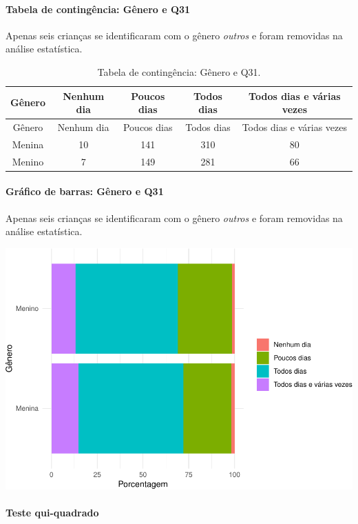 \documentclass[]{article}
\let\oldparagraph\paragraph
\renewcommand{\paragraph}[1]{\oldparagraph{#1}\mbox{}}
\begin{document}
\cleardoublepage

\hypertarget{tabela-de-continguxeancia-guxeanero-e-q31}{%
\paragraph{Tabela de contingência: Gênero e Q31}\label{tabela-de-continguxeancia-guxeanero-e-q31}}

Apenas seis crianças se identificaram com o gênero \emph{outros} e foram removidas na análise estatística.

\begin{longtable}[]{@{}ccccc@{}}
\caption{\label{tab:unnamed-chunk-1026}Tabela de contingência: Gênero e Q31.}\tabularnewline
\toprule
Gênero & Nenhum dia & Poucos dias & Todos dias & Todos dias e várias vezes\tabularnewline
\midrule
\endfirsthead
\toprule
Gênero & Nenhum dia & Poucos dias & Todos dias & Todos dias e várias vezes\tabularnewline
\midrule
\endhead
Menina & 10 & 141 & 310 & 80\tabularnewline
Menino & 7 & 149 & 281 & 66\tabularnewline
\bottomrule
\end{longtable}

\hypertarget{gruxe1fico-de-barras-guxeanero-e-q31}{%
\paragraph{Gráfico de barras: Gênero e Q31}\label{gruxe1fico-de-barras-guxeanero-e-q31}}

Apenas seis crianças se identificaram com o gênero \emph{outros} e foram removidas na análise estatística.

\begin{center}\includegraphics[width=0.75\linewidth]{relatorio_covid19_files/figure-latex/unnamed-chunk-1027-1} \end{center}

\hypertarget{teste-qui-quadrado-88}{%
\paragraph{Teste qui-quadrado}\label{teste-qui-quadrado-88}}
\end{document}

